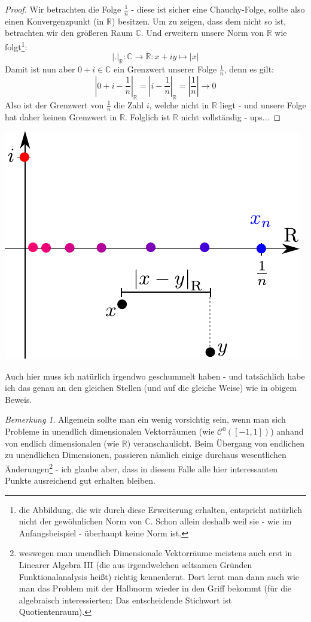 \documentclass[a4paper,ngerman,12pt,bibtotoc]{scrartcl}
\theoremstyle{definition}
\theoremstyle{plain}
\theoremstyle{remark}
\newtheorem{bem}[defn]{Bemerkung}
\newcommand{\RR}{\mathbb{R}}
\newcommand{\CC}{\mathbb{C}}
\begin{document}
	\begin{proof}
		Wir betrachten die Folge $\frac{1}{n}$ - diese ist sicher eine Chauchy-Folge, sollte also einen Konvergenzpunkt (in $\RR$) besitzen. Um zu zeigen, dass dem nicht so ist, betrachten wir den größeren Raum $\CC$. Und erweitern unsere Norm von $\RR$ wie folgt\footnote{die Abbildung, die wir durch diese Erweiterung erhalten, entspricht natürlich nicht der \glqq gewöhnlichen\grqq{} Norm von $\CC$. Schon allein deshalb weil sie - wie im Anfangsbeispiel - überhaupt keine Norm ist.}:
		\[\left\vert.\right\vert_\RR: \CC \to \RR: x+iy \mapsto \left\vert x \right\vert\]
		Damit ist nun aber $0+i \in \CC$ ein Grenzwert unserer Folge $\frac{1}{n}$, denn es gilt:
			\[\left\vert 0+i - \frac{1}{n}\right\vert_\RR = \left\vert i - \frac{1}{n}\right\vert_\RR = \left\vert\frac{1}{n}\right\vert \to 0\]
		Also ist der Grenzwert von $\frac{1}{n}$ die Zahl $i$, welche nicht in $\RR$ liegt - und unsere Folge hat daher keinen Grenzwert in $\RR$. Folglich ist $\RR$ nicht vollständig - ups...
	\end{proof}
	
	\begin{center}
		\includegraphics[width=.4\textwidth]{Nichtvollstaendigkeit2DAnalog.pdf}
	\end{center}
	
	Auch hier muss ich natürlich irgendwo geschummelt haben - und tatsächlich habe ich das genau an den gleichen Stellen (und auf die gleiche Weise) wie in obigem \glqq Beweis\grqq .	
	
	\begin{bem}
		Allgemein sollte man ein wenig vorsichtig sein, wenn man sich Probleme in unendlich dimensionalen Vektorräumen (wie $\mathcal{C}^0\left(\left[-1,1\right]\right)$) anhand von endlich dimensionalen (wie $\RR$) veranschaulicht. Beim Übergang von endlichen zu unendlichen Dimensionen, passieren nämlich einige durchaus wesentlichen Änderungen\footnote{weswegen man unendlich Dimensionale Vektorräume meistens auch erst in Linearer Algebra III (die aus irgendwelchen seltsamen Gründen Funktionalanalysis heißt) richtig kennenlernt. Dort lernt man dann auch wie man das Problem mit der Halbnorm wieder in den Griff bekommt (für die algebraisch interessierten: Das entscheidende Stichwort ist \glqq Quotientenraum\grqq ).} - ich glaube aber, dass in diesem Falle alle hier interessanten Punkte ausreichend gut erhalten bleiben.
	\end{bem}
	
	 
	
	
\end{document}
